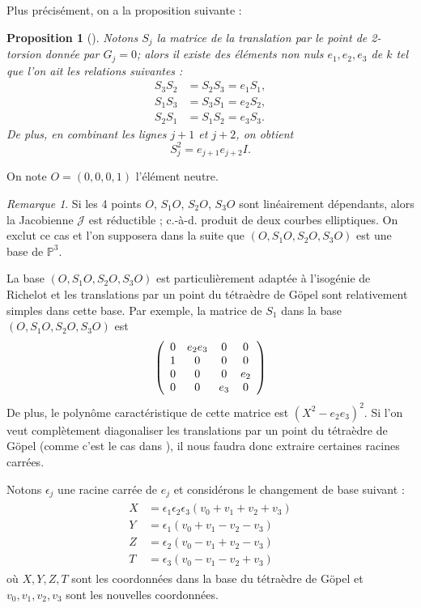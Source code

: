 \documentclass[a4paper,12pt]{article}
\newtheorem{proposition}[theoreme]{Proposition}
\theoremstyle{definition}
\theoremstyle{remark}
\newtheorem{remarque}{Remarque}
\numberwithin{equation}{section}
\begin{document}
Plus précisément, on a la proposition suivante :

\begin{proposition}[\citep{cassels-Flynn}]
Notons $S_j$ la matrice de la translation par le point de 2-torsion donnée par $G_j=0$; alors il existe des éléments non nuls $e_1,e_2,e_3$ de $k$ tel que l'on ait les relations suivantes :
\begin{align*}
S_3S_2 &= S_2S_3 = e_1S_1, \\
S_1S_3 &= S_3S_1 = e_2S_2, \\
S_2S_1 &= S_1S_2 = e_3S_3.
\end{align*}
De plus, en combinant les lignes $j+1$ et $j+2$, on obtient
$$S_j^2 = e_{j+1}e_{j+2}I.$$
\end{proposition}

On note $O=(0,0,0,1)$ l'élément neutre.
\begin{remarque}
Si les 4 points $O$, $S_1O$, $S_2O$, $S_3O$ sont linéairement dépendants, alors la Jacobienne $\mathcal{J}$ est réductible \citep{cassels-Flynn}; c.-à-d. produit de deux courbes elliptiques. On exclut ce cas et l'on supposera dans la suite que $(O,S_1O,S_2O,S_3O)$ est une base de $\mathbb{P}^3$.
\end{remarque}

La base $(O,S_1O,S_2O,S_3O)$ est particulièrement adaptée à l'isogénie de Richelot et les translations par un point du tétraèdre de G\"opel sont relativement simples dans cette base. Par exemple, la matrice de $S_1$ dans la base  $(O,S_1O,S_2O,S_3O)$ est
\[ \left(
  \begin{array}{ c c c c}
     0 & e_2e_3 & 0  & 0  \\
     1 & 0   & 0  & 0  \\
     0 & 0   & 0  & e_2 \\
     0 & 0   & e_3  & 0  \\
  \end{array} \right)
\]
De plus, le polynôme caractéristique de cette matrice est $(X^2-e_2e_3)^2$.
Si l'on veut complètement diagonaliser les translations par un point du tétraèdre de G\"opel (comme c'est le cas dans \citep{gaudry}), il nous faudra donc extraire certaines racines carrées.

Notons $\epsilon_j$ une racine carrée de $e_j$ et considérons le changement de base suivant \citep{cassels-Flynn} :
\begin{align}
\begin{split}
\label{chgBase}
X &= \epsilon_1\epsilon_2\epsilon_3(v_0+v_1+v_2+v_3) \\
Y &= \epsilon_1(v_0+v_1-v_2-v_3) \\
Z &= \epsilon_2(v_0-v_1+v_2-v_3) \\
T &= \epsilon_3(v_0-v_1-v_2+v_3)
\end{split}
\end{align}
où $X,Y,Z,T$ sont les coordonnées dans la base du tétraèdre de G\"opel et $v_0,v_1,v_2,v_3$ sont les nouvelles coordonnées.
\end{document}
